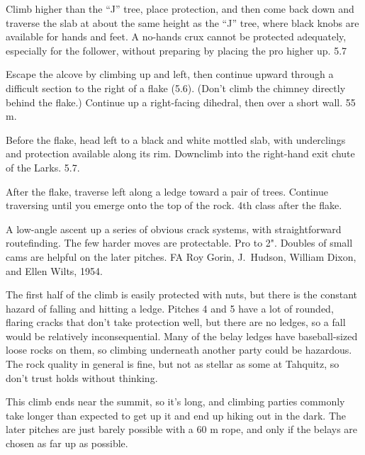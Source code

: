 \documentclass{tahquitz}
\begin{document}
 Climb higher than the ``J'' tree, place protection, and then come
back down and traverse the slab at about the same height as the ``J'' tree, where black
knobs are available for hands and feet. A no-hands crux cannot be protected adequately,
especially for the follower, without preparing by placing the pro higher up. 5.7

 Escape the alcove by climbing up and left, then continue
upward through a difficult section to the right of a flake (5.6).
(Don't climb the chimney directly behind the flake.) Continue up a
right-facing dihedral, then over a short wall.
55 m. 

 Before the flake, head left to a black and white mottled slab, with underclings
and protection available along its rim. Downclimb into the right-hand exit chute of the Larks. 5.7.

 After the flake, traverse left along a ledge toward a pair of trees. Continue
traversing until you emerge onto the top of the rock. 4th class after the flake.

\northgully




A low-angle ascent up a series of obvious crack systems, with straightforward
routefinding.  The few harder moves are protectable. Pro to 2".
Doubles of small cams are helpful on the later pitches.  FA Roy Gorin,
J.~Hudson, William Dixon, and Ellen Wilts, 1954.

The first half of the climb is easily protected with nuts, but there
is the constant hazard of falling and hitting a ledge. Pitches 4 and 5
have a lot of rounded, flaring cracks that don't take protection well,
but there are no ledges, so a fall would be relatively inconsequential.
Many of the belay ledges have baseball-sized loose rocks on them, so
climbing underneath another party could be hazardous. The rock quality
in general is fine, but not as stellar as some at Tahquitz, so don't
trust holds without thinking.

This climb ends near the summit, so it's long, and climbing parties
commonly take longer than expected to get up it and end up hiking out
in the dark.  The later pitches are just barely possible with a 60 m
rope, and only if the belays are chosen as far up as possible.
\end{document}
